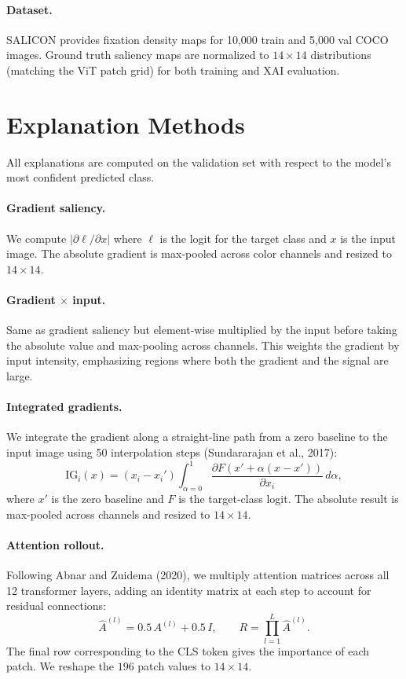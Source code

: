 \documentclass{article}
\begin{document}
\paragraph{Dataset.}
SALICON provides fixation density maps for 10{,}000 train and 5{,}000 val COCO images. Ground truth saliency maps are normalized to $14\!\times\!14$ distributions (matching the ViT patch grid) for both training and XAI evaluation.

\section{Explanation Methods}

All explanations are computed on the validation set with respect to the model's most confident predicted class.

\paragraph{Gradient saliency.}
We compute $|\partial \ell / \partial x|$ where $\ell$ is the logit for the target class and $x$ is the input image. The absolute gradient is max-pooled across color channels and resized to $14\!\times\!14$.

\paragraph{Gradient $\times$ input.}
Same as gradient saliency but element-wise multiplied by the input before taking the absolute value and max-pooling across channels. This weights the gradient by input intensity, emphasizing regions where both the gradient and the signal are large.

\paragraph{Integrated gradients.}
We integrate the gradient along a straight-line path from a zero baseline to the input image using 50 interpolation steps (Sundararajan et al., 2017):
\begin{equation}
\text{IG}_i(x) = (x_i - x_i') \int_{\alpha=0}^{1} \frac{\partial F(x' + \alpha(x - x'))}{\partial x_i}\, d\alpha,
\end{equation}
where $x'$ is the zero baseline and $F$ is the target-class logit. The absolute result is max-pooled across channels and resized to $14\!\times\!14$.

\paragraph{Attention rollout.}
Following Abnar and Zuidema (2020), we multiply attention matrices across all 12 transformer layers, adding an identity matrix at each step to account for residual connections:
\begin{equation}
\hat{A}^{(l)} = 0.5\,A^{(l)} + 0.5\,I, \qquad R = \prod_{l=1}^{L}\hat{A}^{(l)}.
\end{equation}
The final row corresponding to the CLS token gives the importance of each patch. We reshape the $196$ patch values to $14\!\times\!14$.
\end{document}

